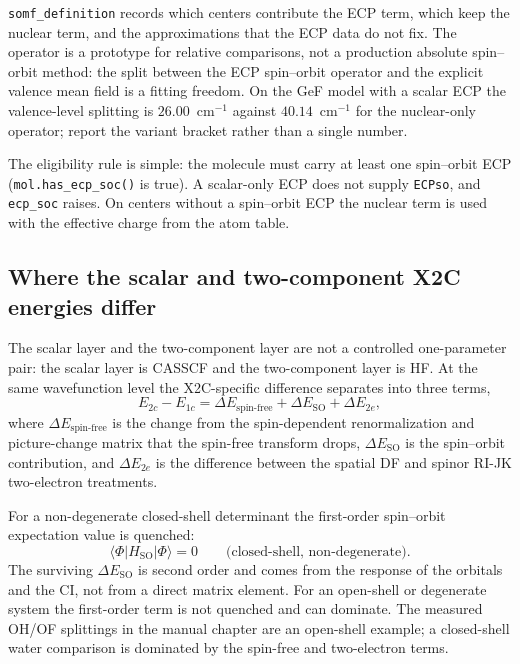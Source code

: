 \texttt{somf\_definition} records which centers contribute the ECP
term, which keep the nuclear term, and the approximations that the ECP
data do not fix.  The operator is a prototype for relative comparisons,
not a production absolute spin--orbit method: the split between the
ECP spin--orbit operator and the explicit valence mean field is a
fitting freedom.  On the GeF model with a scalar ECP the valence-level splitting is
$26.00$~cm$^{-1}$ against $40.14$~cm$^{-1}$ for the nuclear-only
operator; report the variant bracket rather than a single number.

The eligibility rule is simple: the molecule must carry at least one
spin--orbit ECP (\texttt{mol.has\_ecp\_soc()} is true).  A scalar-only
ECP does not supply \texttt{ECPso}, and \texttt{ecp\_soc} raises.  On
centers without a spin--orbit ECP the nuclear term is used with the
effective charge from the atom table.

\subsection{Where the scalar and two-component X2C energies differ}

The scalar layer and the two-component layer are not a controlled
one-parameter pair: the scalar layer is CASSCF and the two-component
layer is HF.  At the same wavefunction level the X2C-specific
difference separates into three terms,
\begin{equation}
  E_{2c}-E_{1c}
  = \Delta E_{\mathrm{spin\text{-}free}}
  + \Delta E_{\mathrm{SO}}
  + \Delta E_{2e},
  \label{eq:tutorial-x2c-difference}
\end{equation}
where $\Delta E_{\mathrm{spin\text{-}free}}$ is the change from the
spin-dependent renormalization and picture-change matrix that the
spin-free transform drops, $\Delta E_{\mathrm{SO}}$ is the
spin--orbit contribution, and $\Delta E_{2e}$ is the difference
between the spatial DF and spinor RI-JK two-electron treatments.

For a non-degenerate closed-shell determinant the first-order
spin--orbit expectation value is quenched:
\begin{equation}
  \langle \Phi | H_{\mathrm{SO}} | \Phi \rangle = 0
  \qquad \text{(closed-shell, non-degenerate)}.
  \label{eq:tutorial-soc-quenched}
\end{equation}
The surviving $\Delta E_{\mathrm{SO}}$ is second order and comes from
the response of the orbitals and the CI, not from a direct matrix
element.  For an open-shell or degenerate system the first-order term
is not quenched and can dominate.  The measured OH/OF splittings in the
manual chapter are an open-shell example; a closed-shell water
comparison is dominated by the spin-free and two-electron terms.

